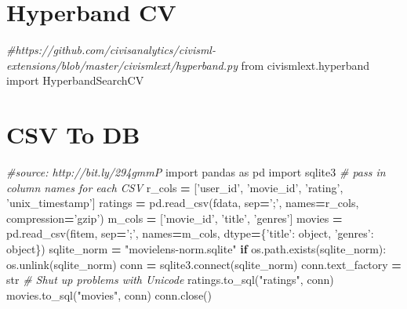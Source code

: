 \documentclass[]{book}
\newenvironment{Shaded}{\begin{snugshade}}{\end{snugshade}}
\newcommand{\BuiltInTok}[1]{#1}
\newcommand{\CommentTok}[1]{\textcolor[rgb]{0.56,0.35,0.01}{\textit{#1}}}
\newcommand{\ControlFlowTok}[1]{\textcolor[rgb]{0.13,0.29,0.53}{\textbf{#1}}}
\newcommand{\ExtensionTok}[1]{#1}
\newcommand{\ImportTok}[1]{#1}
\newcommand{\NormalTok}[1]{#1}
\newcommand{\OperatorTok}[1]{\textcolor[rgb]{0.81,0.36,0.00}{\textbf{#1}}}
\newcommand{\StringTok}[1]{\textcolor[rgb]{0.31,0.60,0.02}{#1}}
\begin{document}
\hypertarget{hyperband-cv}{%
\section{Hyperband CV}\label{hyperband-cv}}

\begin{Shaded}
\begin{Highlighting}[]
\CommentTok{#https://github.com/civisanalytics/civisml-extensions/blob/master/civismlext/hyperband.py}
\ImportTok{from}\NormalTok{ civismlext.hyperband }\ImportTok{import}\NormalTok{ HyperbandSearchCV}
\end{Highlighting}
\end{Shaded}

\hypertarget{csv-to-db}{%
\section{CSV To DB}\label{csv-to-db}}

\begin{Shaded}
\begin{Highlighting}[]
\CommentTok{#source: http://bit.ly/294gmmP}
\ImportTok{import}\NormalTok{ pandas }\ImportTok{as}\NormalTok{ pd}
\ImportTok{import}\NormalTok{ sqlite3}
\CommentTok{# pass in column names for each CSV}
\NormalTok{r_cols }\OperatorTok{=}\NormalTok{ [}\StringTok{'user_id'}\NormalTok{, }\StringTok{'movie_id'}\NormalTok{, }\StringTok{'rating'}\NormalTok{, }\StringTok{'unix_timestamp'}\NormalTok{]}
\NormalTok{ratings }\OperatorTok{=}\NormalTok{ pd.read_csv(fdata, sep}\OperatorTok{=}\StringTok{';'}\NormalTok{, names}\OperatorTok{=}\NormalTok{r_cols, compression}\OperatorTok{=}\StringTok{'gzip'}\NormalTok{)}
\NormalTok{m_cols }\OperatorTok{=}\NormalTok{ [}\StringTok{'movie_id'}\NormalTok{, }\StringTok{'title'}\NormalTok{, }\StringTok{'genres'}\NormalTok{]}
\NormalTok{movies }\OperatorTok{=}\NormalTok{ pd.read_csv(fitem, sep}\OperatorTok{=}\StringTok{';'}\NormalTok{, names}\OperatorTok{=}\NormalTok{m_cols, dtype}\OperatorTok{=}\NormalTok{\{}\StringTok{'title'}\NormalTok{: }\BuiltInTok{object}\NormalTok{, }\StringTok{'genres'}\NormalTok{: }\BuiltInTok{object}\NormalTok{\})}
\NormalTok{sqlite_norm }\OperatorTok{=} \StringTok{"movielens-norm.sqlite"}
\ControlFlowTok{if}\NormalTok{ os.path.exists(sqlite_norm):}
\NormalTok{    os.unlink(sqlite_norm)}
\NormalTok{conn }\OperatorTok{=}\NormalTok{ sqlite3.}\ExtensionTok{connect}\NormalTok{(sqlite_norm)}
\NormalTok{conn.text_factory }\OperatorTok{=} \BuiltInTok{str}   \CommentTok{# Shut up problems with Unicode}
\NormalTok{ratings.to_sql(}\StringTok{"ratings"}\NormalTok{, conn)}
\NormalTok{movies.to_sql(}\StringTok{"movies"}\NormalTok{, conn)}
\NormalTok{conn.close()}
\end{Highlighting}
\end{Shaded}
\end{document}

